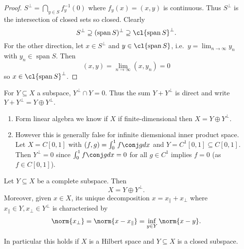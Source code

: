 \documentclass[a4paper]{article}
\DeclareMathOperator{\spans}{span} %
\begin{document}
\begin{proof}
  \(S^\perp = \bigcap_{y \in S} f^{-1}_y(0)\) where \(f_y(x) = (x, y)\) is continuous. Thus \(S^\perp\) is the intersection of closed sets so closed. Clearly
  \[
    S^\perp \supseteq (\spans S)^\perp \supseteq \cl{\spans S}^\perp.
  \]
  For the other direction, let \(x \in S^\perp\) and \(y \in \cl{\spans S}\), i.e.\ \(y = \lim_{n \to \infty} y_n\) with \(y_n \in \spans S\). Then
  \[
    (x, y) = \lim_{n \to \infty} (x, y_n) = 0
  \]
  so \(x \in \cl{\spans S}^\perp\).
\end{proof}

\begin{notation}
  For \(Y \subseteq X\) a subspace, \(Y^\perp \cap Y = 0\). Thus the sum \(Y + Y^\perp\) is direct and write \(Y + Y^\perp = Y \oplus Y^\perp\).
\end{notation}

\begin{eg}\leavevmode
  \begin{enumerate}
  \item Form linear algebra we know if \(X\) if finite-dimensional then \(X = Y \oplus Y^\perp\).
  \item However this is generally false for infinite diemsnional inner product space. Let \(X = C[0, 1]\) with \((f, g) = \int_0^1 f \conj g dx\) and \(Y = C^1[0, 1] \subseteq C[0, 1]\). Then \(Y^\perp = 0\) since \(\int_0^1 f \conj g dx = 0\) for all \(g \in C^1\) implies \(f = 0\) (as \(f \in C[0, 1]\)).
  \end{enumerate}
\end{eg}

\begin{theorem}
  Let \(Y \subseteq X\) be a complete subspace. Then
  \[
    X = Y \oplus Y^\perp.
  \]
  Moreover, given \(x \in X\), its unique decomposition \(x = x_\parallel + x_\perp\) where \(x_\parallel \in Y, x_\perp \in Y^\perp\) is characterised by
  \[
    \norm{x_\perp} = \norm{x - x_\parallel} = \inf_{y \in Y} \norm{x - y}.
  \]
\end{theorem}

In particular this holds if \(X\) is a Hilbert space and \(Y \subseteq X\) is a closed subspace.
\end{document}
